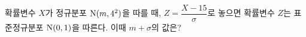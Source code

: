 확률변수 $X$가 정규분포 $\mathrm{N}(m{,}\mkern3mu\mathopen{}4^2)$을 따를 때, $Z=\dfrac{X-15}{\sigma}$로 놓으면 확률변수 $Z$는 표준정규분포 $\mathrm{N}(0{,}\mkern3mu\mathopen{}1)$을 따른다. 이때 $m+\sigma$의 값은?

